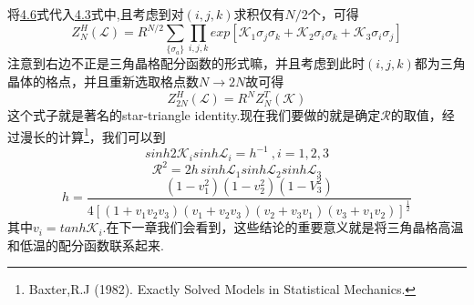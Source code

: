 \documentclass[a4paper]{book}
\begin{document}
将\hyperref[4.6]{4.6}式代入\hyperref[4.3]{4.3}式中,且考虑到对$(i,j,k)$求积仅有$N/2$个，可得
\begin{equation}
		Z_N^H(\mathcal{L})=R^{N/2}\sum_{\{\sigma_a\}}\prod_{i,j,k}exp[\mathcal{K}_1\sigma_j\sigma_k+\mathcal{K}_2\sigma_i\sigma_k+\mathcal{K}_3\sigma_i\sigma_j]
\end{equation}
注意到右边不正是三角晶格配分函数的形式嘛，并且考虑到此时$(i,j,k)$都为三角晶体的格点，并且重新选取格点数$N\rightarrow2N$故可得
\begin{equation}\label{4.8}
		Z_{2N}^H(\mathcal{L})=R^NZ^T_N(\mathcal{K})
\end{equation}
这个式子就是著名的star-triangle identity.现在我们要做的就是确定$\mathcal{R}$的取值，经过漫长的计算\footnote{Baxter,R.J (1982). Exactly Solved Models in Statistical Mechanics.}，我们可以到
\begin{equation}
	sinh2\mathcal{K}_isinh\mathcal{L}_i=h^{-1}~,i=1,2,3
\end{equation}
\begin{equation}
	\mathcal{R}^2=2h\,sinh\mathcal{L}_1sinh\mathcal{L}_2sinh\mathcal{L}_3
\end{equation}
\begin{equation}\label{4.11}
	h=\frac{(1-v^2_1)(1-v^2_2)(1-V^2_3)}{4[(1+v_1v_2v_3)(v_1+v_2v_3)(v_2+v_3v_1)(v_3+v_1v_2)]^{\frac{1}{2}}}
\end{equation}
其中$v_i=tanh\mathcal{K}_i$.在下一章我们会看到，这些结论的重要意义就是将三角晶格高温和低温的配分函数联系起来.
\end{document}
